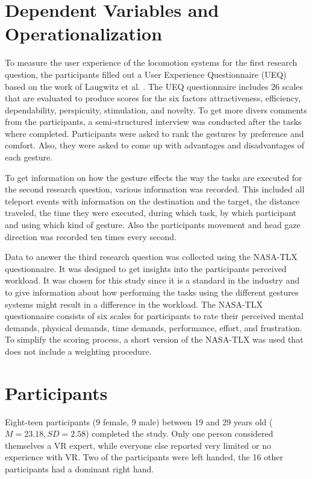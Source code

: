 \section{Dependent Variables and Operationalization}
To measure the user experience of the locomotion systems for the first research question, the participants filled out a User Experience Questionnaire (UEQ) based on the work of Laugwitz et al. \cite{Laugwitz2008}. The UEQ questionnaire includes 26 scales that are evaluated to produce scores for the six factors attractiveness, efficiency, dependability, perspicuity, stimulation, and novelty. 
To get more divers comments from the participants, a semi-structured interview was conducted after the tasks where completed. Participants were asked to rank the gestures by preference and comfort. Also, they were asked to come up with advantages and disadvantages of each gesture.

To get information on how the gesture effects the way the tasks are executed for the second research question, various information was recorded. This included all teleport events with information on the destination and the target, the distance traveled, the time they were executed, during which task, by which participant and using which kind of gesture. Also the participants movement and head gaze direction was recorded ten times every second.  

Data to answer the third research question was collected using the NASA-TLX questionnaire. %
It was designed to get insights into the participants perceived workload. It was chosen for this study since it is a standard in the industry and to give information about how performing the tasks using the different gestures systems might result in a difference in the workload. The NASA-TLX questionnaire consists of six scales for participants to rate their perceived mental demands, physical demands, time demands, performance, effort, and frustration. To simplify the scoring process, a short version of the NASA-TLX was used that does not include a weighting procedure. %

\section{Participants}
Eight-teen participants (9 female, 9 male) between 19 and 29 years old ($M=23.18,SD=2.58$) completed the study. Only one person considered themselves a VR expert, while everyone else reported very limited or no experience with VR. Two of the participants were left handed, the 16 other participants had a dominant right hand. 

